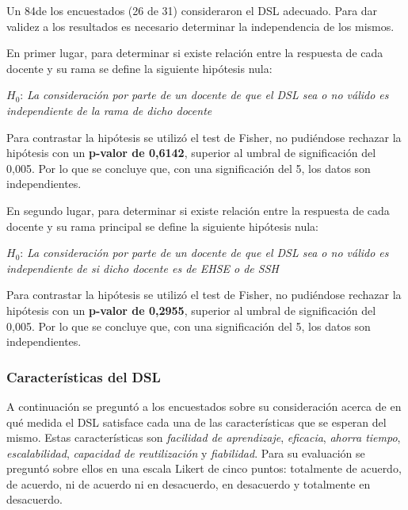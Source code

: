 Un 84\percentage{ }de los encuestados (26 de 31) consideraron el DSL adecuado. Para dar validez a los resultados es necesario determinar la independencia de los mismos.

En primer lugar, para determinar si existe relación entre la respuesta de cada docente y su rama se define la siguiente hipótesis nula:

\medskip
\begin{mdframed}[style=hipotesis0]
$H_0$: \emph{La consideración por parte de un docente de que el DSL sea o no válido es independiente de la rama de dicho docente}
\end{mdframed}

\medskip
Para contrastar la hipótesis se utilizó el test de Fisher, no pudiéndose rechazar la hipótesis con un \textbf{p-valor de 0,6142}, superior al umbral de significación del 0,005. Por lo que se concluye que, con una significación del 5\percentage, los datos son independientes.

En segundo lugar, para determinar si existe relación entre la respuesta de cada docente y su rama principal se define la siguiente hipótesis nula:

\medskip
\begin{mdframed}[style=hipotesis0]
$H_0$: \emph{La consideración por parte de un docente de que el DSL sea o no válido es independiente de si  dicho docente es de EHSE o de SSH}
\end{mdframed}

\medskip
Para contrastar la hipótesis se utilizó el test de Fisher, no pudiéndose rechazar la hipótesis con un \textbf{p-valor de 0,2955}, superior al umbral de significación del 0,005. Por lo que se concluye que, con una significación del 5\percentage, los datos son independientes.

\subsubsection*{Características del DSL}

A continuación se preguntó a los encuestados sobre su consideración acerca de en qué medida el DSL satisface cada una de las características que se esperan del mismo. Estas características son \emph{facilidad de aprendizaje}, \emph{eficacia}, \emph{ahorra tiempo}, \emph{escalabilidad}, \emph{capacidad de reutilización} y \emph{fiabilidad}. Para su evaluación se preguntó sobre ellos en una escala Likert de cinco puntos: totalmente de acuerdo, de acuerdo, ni de acuerdo ni en desacuerdo, en desacuerdo y totalmente en desacuerdo. 


